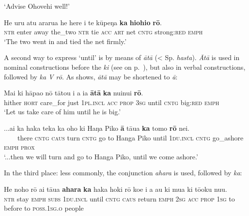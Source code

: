 \glt 
‘Advise Ohovehi well!’ \textstyleExampleref{[R310.277]} 
\z

\ea\label{ex:11.240}
\gll He uru atu ararua he here i te kūpeŋa \textbf{ka} \textbf{hiohio} \textbf{rō}. \\
\textsc{ntr} enter away the\_two \textsc{ntr} tie \textsc{acc} \textsc{art} net \textsc{cntg} strong:\textsc{red} \textsc{emph} \\

\glt 
‘The two went in and tied the net firmly.’ \textstyleExampleref{[R310.397]}\textstyleExampleref{} 
\z

A second way to express ‘until’ is by means of \textit{{\ꞌ}ātā} ({\textless} Sp. \textit{hasta}). \textit{{\ꞌ}Ātā} is used in nominal constructions before the  \textit{ki} (see  on p.~\pageref{ex:4.267}), but also in verbal constructions, followed by \textit{ka V rō}. As  shows, \textit{{\ꞌ}ātā} may be shortened to \textit{{\ꞌ}ā}:

\ea\label{ex:11.241}
\gll Mai ki hāpa{\ꞌ}o nō tātou i a ia \textbf{{\ꞌ}ātā} \textbf{ka} nuinui \textbf{rō}.\\
hither \textsc{hort} care\_for just \textsc{1pl.incl} \textsc{acc} \textsc{prop} \textsc{3sg} until \textsc{cntg} big:\textsc{red} \textsc{emph}\\

\glt 
‘Let us take care of him until he is big.’ \textstyleExampleref{[R211.063]} 
\z

\ea\label{ex:11.242}
\gll ...{\ꞌ}ai ka haka teka ka oho ki Haŋa Piko  \textbf{{\ꞌ}ā} tāua \textbf{ka} tomo \textbf{rō} nei.\\
~~~~there \textsc{cntg} \textsc{caus} turn \textsc{cntg} go to Hanga Piko  until \textsc{1du.incl} \textsc{cntg} go\_ashore \textsc{emph} \textsc{prox}\\

\glt 
‘...then we will turn and go to Hanga Piko, until we come ashore.’ \textstyleExampleref{[R230.401]} 
\z

In the third place: less commonly, the conjunction \textit{{\ꞌ}ahara} is used, followed by \textit{ka}:

\ea\label{ex:11.243}
\gll He noho rō {\ꞌ}ai tāua \textbf{{\ꞌ}ahara} \textbf{ka} haka hoki rō koe i a au  ki mu{\ꞌ}a ki tō{\ꞌ}oku nu{\ꞌ}u.\\
\textsc{ntr} stay \textsc{emph} \textsc{subs} \textsc{1du.incl} until \textsc{cntg} \textsc{caus} return \textsc{emph} \textsc{2sg} \textsc{acc} \textsc{prop} \textsc{1sg}  to before to \textsc{poss.1sg.o} people\\

